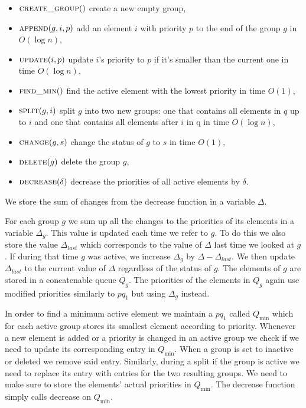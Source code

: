 \begin{itemize}
    \item $\textsc{create\_group}()$ create a new empty group,
    \item $\textsc{append}(g, i, p)$ add an element $i$ with priority $p$ to the end of the group $g$ in $O(\log n)$,
    \item $\textsc{update}(i, p)$ update $i$'s priority to $p$ if it's smaller than the current one in time $O(\log n)$,
    \item $\textsc{find\_min}()$ find the active element with the lowest priority in time $O(1)$,
    \item $\textsc{split}(g, i)$ split $g$ into two new groups: one that contains all elements in $q$ up to $i$ and one that contains all elements after $i$ in q in time $O(\log n)$,
    \item $\textsc{change}(g, s)$ change the status of $g$ to $s$ in time $O(1)$,
    \item $\textsc{delete}(g)$ delete the group $g$,
    \item $\textsc{decrease}(\delta)$ decrease the priorities of all active elements by $\delta$.
\end{itemize}

We store the sum of changes from the decrease function in a variable $\Delta$.

For each group $g$ we sum up all the changes to the priorities of its elements in a variable $\Delta_g$. This value is updated each time we refer to $g$. To do this we also store the value $\Delta_{last}$ which corresponds to the value of $\Delta$ last time we looked at $g$. If during that time $g$ was active, we increase $\Delta_g$ by $\Delta - \Delta_{last}$. We then update $\Delta_{last}$ to the current value of $\Delta$ regardless of the status of $g$. The elements of $g$ are stored in a concatenable queue $Q_g$. The priorities of the elements in $Q_g$ again use modified priorities similarly to $pq_1$ but using $\Delta_g$ instead. 

In order to find a minimum active element we maintain a $pq_1$ called $Q_{\min}$ which for each active group stores its smallest element according to priority. Whenever a new element is added or a priority is changed in an active group we check if we need to update its corresponding entry in $Q_{\min}$. When a group is set to inactive or deleted we remove said entry. Similarly, during a split if the group is active we need to replace its entry with entries for the two resulting groups. We need to make sure to store the elements' actual priorities in $Q_{\min}$. The decrease function simply calls decrease on $Q_{\min}$.

